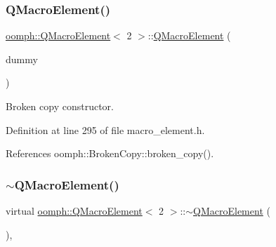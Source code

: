 \mbox{\label{classoomph_1_1QMacroElement_3_012_01_4_afb16986bbc009e8d23a434d6dc6631bc}} 
\subsubsection{\texorpdfstring{Q\+Macro\+Element()}{QMacroElement()}\hspace{0.1cm}{\footnotesize\ttfamily [3/3]}}
{\footnotesize\ttfamily \hyperlink{classoomph_1_1QMacroElement}{oomph\+::\+Q\+Macro\+Element}$<$ 2 $>$\+::\hyperlink{classoomph_1_1QMacroElement}{Q\+Macro\+Element} (\begin{DoxyParamCaption}\item[{const \hyperlink{classoomph_1_1QMacroElement}{Q\+Macro\+Element}$<$ 2 $>$ \&}]{dummy }\end{DoxyParamCaption})\hspace{0.3cm}{\ttfamily [inline]}}



Broken copy constructor. 



Definition at line 295 of file macro\+\_\+element.\+h.



References oomph\+::\+Broken\+Copy\+::broken\+\_\+copy().

\mbox{\label{classoomph_1_1QMacroElement_3_012_01_4_a5645cf8b388a4d7d51c1893d886db0cd}} 
\subsubsection{\texorpdfstring{$\sim$\+Q\+Macro\+Element()}{~QMacroElement()}}
{\footnotesize\ttfamily virtual \hyperlink{classoomph_1_1QMacroElement}{oomph\+::\+Q\+Macro\+Element}$<$ 2 $>$\+::$\sim$\hyperlink{classoomph_1_1QMacroElement}{Q\+Macro\+Element} (\begin{DoxyParamCaption}{ }\end{DoxyParamCaption})\hspace{0.3cm}{\ttfamily [inline]}, {\ttfamily [virtual]}}



